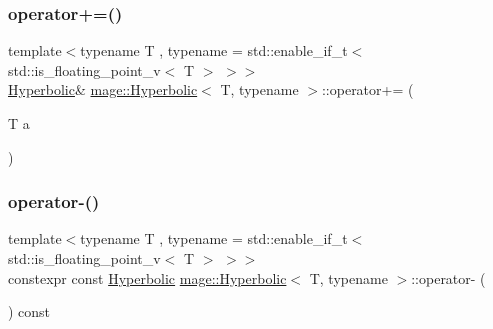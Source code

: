 \subsubsection{\texorpdfstring{operator+=()}{operator+=()}\hspace{0.1cm}{\footnotesize\ttfamily [2/2]}}
{\footnotesize\ttfamily template$<$typename T , typename  = std\+::enable\+\_\+if\+\_\+t$<$ std\+::is\+\_\+floating\+\_\+point\+\_\+v$<$ T $>$ $>$$>$ \\
\mbox{\hyperlink{structmage_1_1_hyperbolic}{Hyperbolic}}\& \mbox{\hyperlink{structmage_1_1_hyperbolic}{mage\+::\+Hyperbolic}}$<$ T, typename $>$\+::operator+= (\begin{DoxyParamCaption}\item[{T}]{a }\end{DoxyParamCaption})\hspace{0.3cm}{\ttfamily [noexcept]}}

\mbox{\label{structmage_1_1_hyperbolic_ae73e59c395f4e77003e2f8b8a2dbfc64}} 
\subsubsection{\texorpdfstring{operator-\/()}{operator-()}\hspace{0.1cm}{\footnotesize\ttfamily [1/3]}}
{\footnotesize\ttfamily template$<$typename T , typename  = std\+::enable\+\_\+if\+\_\+t$<$ std\+::is\+\_\+floating\+\_\+point\+\_\+v$<$ T $>$ $>$$>$ \\
constexpr const \mbox{\hyperlink{structmage_1_1_hyperbolic}{Hyperbolic}} \mbox{\hyperlink{structmage_1_1_hyperbolic}{mage\+::\+Hyperbolic}}$<$ T, typename $>$\+::operator-\/ (\begin{DoxyParamCaption}{ }\end{DoxyParamCaption}) const\hspace{0.3cm}{\ttfamily [noexcept]}}

\mbox{\label{structmage_1_1_hyperbolic_a701a1570eb486a968e2eec7897383b00}} 

